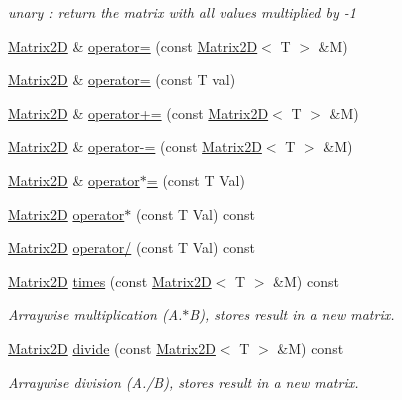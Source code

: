 \begin{DoxyCompactItemize}
\begin{DoxyCompactList}\small\item\em unary \+: return the matrix with all values multiplied by -\/1 \end{DoxyCompactList}\item 
\hyperlink{class_matrix2_d}{Matrix2\+D} \& \hyperlink{class_matrix2_d_af1ebb386ce4617c538d439b9a49a2c8a}{operator=} (const \hyperlink{class_matrix2_d}{Matrix2\+D}$<$ T $>$ \&M)
\item 
\hyperlink{class_matrix2_d}{Matrix2\+D} \& \hyperlink{class_matrix2_d_a2fd821cd452ca6ad7876d80a474317bc}{operator=} (const T val)
\item 
\hyperlink{class_matrix2_d}{Matrix2\+D} \& \hyperlink{class_matrix2_d_a14d8f8a8e1486b651ea89eab42b3a656}{operator+=} (const \hyperlink{class_matrix2_d}{Matrix2\+D}$<$ T $>$ \&M)
\item 
\hyperlink{class_matrix2_d}{Matrix2\+D} \& \hyperlink{class_matrix2_d_a14d897df200232ef72e45712d3e05239}{operator-\/=} (const \hyperlink{class_matrix2_d}{Matrix2\+D}$<$ T $>$ \&M)
\item 
\hyperlink{class_matrix2_d}{Matrix2\+D} \& \hyperlink{class_matrix2_d_a7f2286ec4a3ee59c3078293542c87f99}{operator$\ast$=} (const T Val)
\item 
\hyperlink{class_matrix2_d}{Matrix2\+D} \hyperlink{class_matrix2_d_af3c580056aa3f3feef993bd59b67888a}{operator$\ast$} (const T Val) const 
\item 
\hyperlink{class_matrix2_d}{Matrix2\+D} \hyperlink{class_matrix2_d_a7b72d73070887951b95d1f45e7fcbe5b}{operator/} (const T Val) const 
\item 
\hyperlink{class_matrix2_d}{Matrix2\+D} \hyperlink{class_matrix2_d_a83d78e9d137db632a53fd89616dcfb9d}{times} (const \hyperlink{class_matrix2_d}{Matrix2\+D}$<$ T $>$ \&M) const 
\begin{DoxyCompactList}\small\item\em Arraywise multiplication (A.$\ast$\+B), stores result in a new matrix. \end{DoxyCompactList}\item 
\hyperlink{class_matrix2_d}{Matrix2\+D} \hyperlink{class_matrix2_d_a1a282f6e2f1623611cf2a9a67bee50a0}{divide} (const \hyperlink{class_matrix2_d}{Matrix2\+D}$<$ T $>$ \&M) const 
\begin{DoxyCompactList}\small\item\em Arraywise division (A./\+B), stores result in a new matrix. \end{DoxyCompactList}\item 

\end{DoxyCompactItemize}
